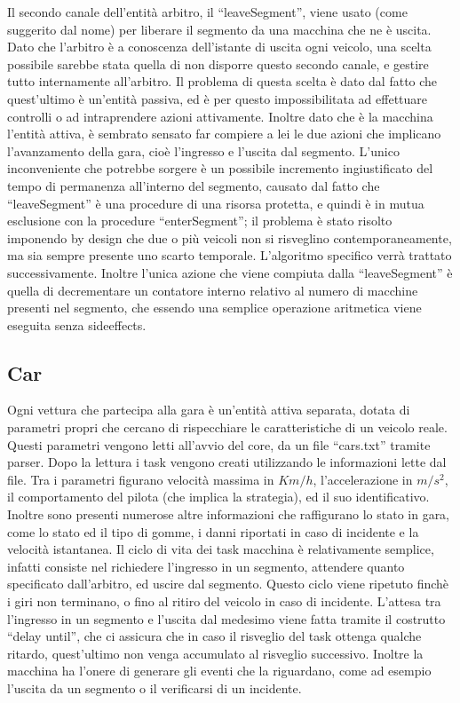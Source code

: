 Il secondo canale dell’entità arbitro, il “leaveSegment”, viene usato (come suggerito dal nome) per liberare il segmento da una macchina che ne è uscita. Dato che l’arbitro è a conoscenza dell’istante di uscita ogni veicolo, una scelta possibile sarebbe stata quella di non disporre questo secondo canale, e gestire tutto internamente all’arbitro. Il problema di questa scelta è dato dal fatto che quest’ultimo è un’entità passiva, ed è per questo impossibilitata ad effettuare controlli o ad intraprendere azioni attivamente. Inoltre dato che è la macchina l’entità attiva, è sembrato sensato far compiere a lei le due azioni che implicano l’avanzamento della gara, cioè l’ingresso e l’uscita dal segmento. L’unico inconveniente che potrebbe sorgere è un possibile incremento ingiustificato del tempo di permanenza all'interno del segmento, causato dal fatto che “leaveSegment” è una procedure di una risorsa protetta, e quindi è in mutua esclusione con la procedure “enterSegment”; il problema è stato risolto imponendo by design che due o più veicoli non si risveglino contemporaneamente, ma sia sempre presente uno scarto temporale. L'algoritmo specifico verrà trattato successivamente.
Inoltre l’unica azione che viene compiuta dalla “leaveSegment” è quella di decrementare un contatore interno relativo al numero di macchine presenti nel segmento, che essendo una semplice operazione aritmetica viene eseguita senza sideeffects.


\subsection{Car}

Ogni vettura che partecipa alla gara è un’entità attiva separata, dotata di parametri propri che cercano di rispecchiare le caratteristiche di un veicolo reale. Questi parametri vengono letti all’avvio del core, da un file “cars.txt” tramite parser. Dopo la lettura i task vengono creati utilizzando le informazioni lette dal file. Tra i parametri figurano velocità massima in $Km/h$, l’accelerazione in $m/s^2$, il comportamento del pilota (che implica la strategia), ed il suo identificativo. Inoltre sono presenti numerose altre informazioni che raffigurano lo stato in gara, come lo stato ed il tipo di gomme, i danni riportati in caso di incidente e la velocità istantanea.
Il ciclo di vita dei task macchina è relativamente semplice, infatti consiste nel richiedere l’ingresso in un segmento, attendere quanto specificato dall’arbitro, ed uscire dal segmento.
Questo ciclo viene ripetuto finchè i giri non terminano, o fino al ritiro del veicolo in caso di incidente.
L’attesa tra l’ingresso in un segmento e l’uscita dal medesimo viene fatta tramite il costrutto “delay until”, che ci assicura che in caso il risveglio del task ottenga qualche ritardo, quest’ultimo non venga accumulato al risveglio successivo.
Inoltre la macchina ha l’onere di generare gli eventi che la riguardano, come ad esempio l’uscita da un segmento o il verificarsi di un incidente.

